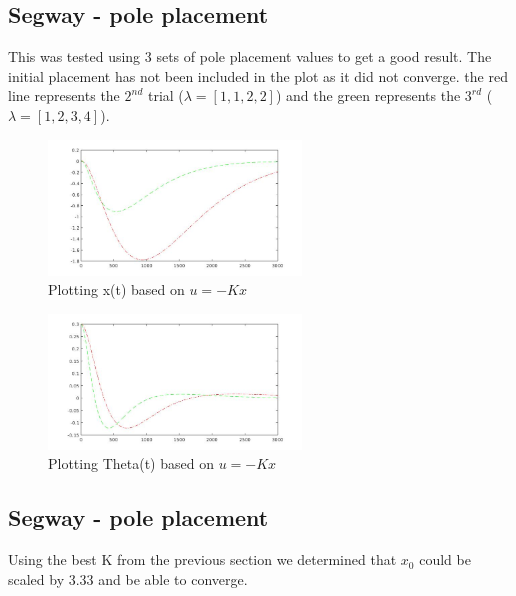 \documentclass{article}
\begin{document}


\subsection{Segway - pole placement}



This was tested using 3 sets of pole placement values to get a good result. The initial placement has not been included in the plot as it did not converge.
the red line represents the $2^{nd}$ trial ($\lambda = [1,1,2,2]$) and the green represents the $3^{rd}$ ($\lambda = [1,2,3,4]$).

\begin{figure}[H]
    \centering
    \includegraphics[width=0.6\textwidth]{x_pos_segway.jpg}
    \caption{Plotting x(t) based on $u=-Kx$}
    \label{fig:x_segway}
\end{figure}

\begin{figure}[H]
    \centering
    \includegraphics[width=0.6\textwidth]{th_pos_segway.jpg}
    \caption{Plotting Theta(t) based on $u=-Kx$}
    \label{fig:th_segway}
\end{figure}

\subsection{Segway - pole placement}

Using the best K from the previous section we determined that $x_0$ could be scaled by 3.33 and be able to converge.
\end{document}
